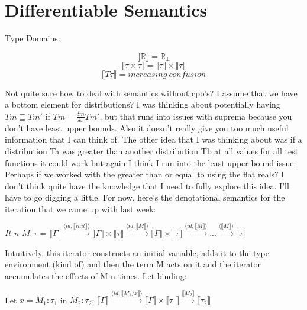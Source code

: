 \documentclass{article}
\begin{document}
    \section{Differentiable Semantics}
    Type Domains:
    \begin{center}
        $$\llbracket \mathbb{R} \rrbracket = \mathbb{R}_\bot$$
        $$\llbracket \tau \times \tau \rrbracket = \llbracket \tau \rrbracket \times \llbracket \tau \rrbracket$$
        $$\llbracket T\tau \rrbracket = increasing\ confusion$$
    \end{center}
    Not quite sure how to deal with semantics without cpo's? I assume that we have a bottom element for distributions? I was thinking about potentially having $Tm \sqsubseteq Tm'$ if $Tm = \frac{\delta m}{\delta x} Tm'$, but that runs into issues with suprema because you don't have least upper bounds. Also it doesn't really give you too much useful information that I can think of. The other idea that I was thinking about was if a distribution Ta was greater than another distribution Tb at all values for all test functions it could work but again I think I run into the least upper bound issue. Perhaps if we worked with the greater than or equal to using the flat reals? I don't think quite have the knowledge that I need to fully explore this idea. I'll have to go digging a little. For now, here's the denotational semantics for the iteration that we came up with last week:
    \begin{center}
        $It$ $n$ $M:\tau$ = $\llbracket \Gamma \rrbracket \xrightarrow{\langle id, \llbracket init \rrbracket \rangle}\llbracket \Gamma \rrbracket \times \llbracket \tau \rrbracket \xrightarrow{\langle id, \llbracket M \rrbracket \rangle}\llbracket \Gamma \rrbracket \times \llbracket \tau \rrbracket \xrightarrow{\langle id, \llbracket M \rrbracket \rangle}... \xrightarrow{\langle \llbracket M \rrbracket \rangle} \llbracket \tau \rrbracket$
    \end{center}
    Intuitively, this iterator constructs an initial variable, adds it to the type environment (kind of) and then the term M acts on it and the iterator accumulates the effects of M n times. 
    \newline
    Let binding:
    \begin{center}
        Let $x = M_1:\tau_1$ in $M_2:\tau_2$: $\llbracket \Gamma \rrbracket \xrightarrow{\langle id, \llbracket M_1/x \rrbracket \rangle} \llbracket \Gamma \rrbracket \times \llbracket \tau_1 \rrbracket  \xrightarrow{\llbracket M_2 \rrbracket} \llbracket \tau_2 \rrbracket$
    \end{center}
\end{document}
